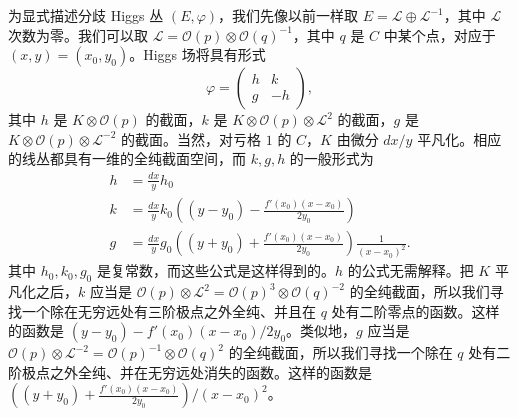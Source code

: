 \documentclass[11pt,a4paper]{article}
\begin{document}
为显式描述分歧 Higgs 丛 $(E,\varphi)$，我们先像以前一样取 $E=\mathcal{L}\oplus\mathcal{L}^{-1}$，其中 $\mathcal{L}$ 次数为零。我们可以取 $\mathcal{L}=\mathcal{O}(p)\otimes\mathcal{O}(q)^{-1}$，其中 $q$ 是 $C$ 中某个点，对应于 $(x,y)=(x_0,y_0)$。Higgs 场将具有形式
\begin{equation}\tag{3.8}
\varphi=
\begin{pmatrix}
h & k\\
g & -h
\end{pmatrix},
\end{equation}
其中 $h$ 是 $K\otimes\mathcal{O}(p)$ 的截面，$k$ 是 $K\otimes\mathcal{O}(p)\otimes\mathcal{L}^2$ 的截面，$g$ 是 $K\otimes\mathcal{O}(p)\otimes\mathcal{L}^{-2}$ 的截面。当然，对亏格 $1$ 的 $C$，$K$ 由微分 $dx/y$ 平凡化。相应的线丛都具有一维的全纯截面空间，而 $k,g,h$ 的一般形式为
\begin{equation}\tag{3.9}
\begin{aligned}
h &= \frac{dx}{y}h_0\\
k &= \frac{dx}{y}k_0\left((y-y_0)-\frac{f'(x_0)(x-x_0)}{2y_0}\right)\\
g &= \frac{dx}{y}g_0\left((y+y_0)+\frac{f'(x_0)(x-x_0)}{2y_0}\right)\frac{1}{(x-x_0)^2}.
\end{aligned}
\end{equation}
其中 $h_0,k_0,g_0$ 是复常数，而这些公式是这样得到的。$h$ 的公式无需解释。把 $K$ 平凡化之后，$k$ 应当是 $\mathcal{O}(p)\otimes\mathcal{L}^2=\mathcal{O}(p)^3\otimes\mathcal{O}(q)^{-2}$ 的全纯截面，所以我们寻找一个除在无穷远处有三阶极点之外全纯、并且在 $q$ 处有二阶零点的函数。这样的函数是 $(y-y_0)-f'(x_0)(x-x_0)/2y_0$。类似地，$g$ 应当是 $\mathcal{O}(p)\otimes\mathcal{L}^{-2}=\mathcal{O}(p)^{-1}\otimes\mathcal{O}(q)^2$ 的全纯截面，所以我们寻找一个除在 $q$ 处有二阶极点之外全纯、并在无穷远处消失的函数。这样的函数是 $\left((y+y_0)+\frac{f'(x_0)(x-x_0)}{2y_0}\right)/(x-x_0)^2$。
\end{document}
